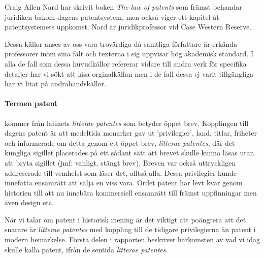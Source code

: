 Craig Allen Nard har skrivit boken \emph{The law of patents} som främst 
behandar juridiken bakom dagens patentsystem, men också viger ett kapitel åt 
patentsystemets uppkomst. Nard är juridikprofessor vid Case Western Reserve.

Dessa källor anses av oss vara trovärdiga då samtliga författare är erkända 
professorer inom sina fält och texterna i sig uppvisar hög akademisk standard. 
I alla de fall som dessa huvudkällor refererar vidare till andra verk för 
specifika detaljer har vi sökt att läsa orginalkällan men i de fall dessa ej 
varit tillgängliga har vi litat på andrahandskällor.

\paragraph{Termen patent} kommer från latinets \emph{litterae patentes} som
betyder öppet brev. Kopplingen till dagens patent är att medeltida monarker gav
ut 'privilegier', land, titlar, friheter och informerade om detta genom ett
öppet brev, \emph{litterae patentes}, där det kungliga sigillet placerades på
ett sådant sätt att brevet skulle kunna läsas utan att bryta sigillet (jmf: 
vanligt, stängt brev). Breven var också uttryckligen addreserade till 
vemhelst som läser det, alltså alla. Dessa privilegier kunde innefatta ensamrätt
att sälja en viss vara. Ordet patent har levt kvar genom historien till 
att nu innebära kommersiell ensamrätt till främst uppfinningar men även 
design etc. \cite{blackstone vad hänvisas?}

När vi talar om patent i historisk mening är det viktigt att poängtera att det 
snarare är \emph{litterae patentes} med koppling till de tidigare 
privilegierna än patent i modern bemärkelse. Första delen i rapporten beskriver
härkomsten av vad vi idag skulle kalla patent, ifrån de sentida \emph{litterae patentes}.
